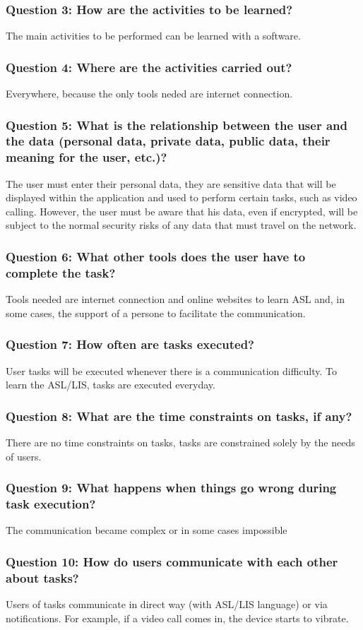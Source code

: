 \subsubsection{Question 3: How are the activities to be learned?}
The main activities to be performed can be learned with a software.

\subsubsection{Question 4: Where are the activities carried out?}
Everywhere, because the only tools neded are internet connection.

\subsubsection{Question 5: What is the relationship between the user and the data (personal data, private data, public data, their meaning for the user, etc.)?}
The user must enter their personal data, they are sensitive data that will be displayed within the application and used to perform certain tasks, such as video calling. However, the user must be aware that his data, even if encrypted, will be subject to the normal security risks of any data that must travel on the network.

\subsubsection{Question 6: What other tools does the user have to complete the task?}
Tools needed are internet connection and online websites to learn ASL and, in some cases, the support of a persone to facilitate the communication.

\subsubsection{Question 7: How often are tasks executed?}
User tasks will be executed whenever there is a communication difficulty. To learn the ASL/LIS, tasks are executed everyday.

\subsubsection{Question 8: What are the time constraints on tasks, if any?}
There are no time constraints on tasks, tasks are constrained solely by the needs of users.

\subsubsection{Question 9: What happens when things go wrong during task execution?}
The communication became complex or in some cases impossible

\subsubsection{Question 10: How do users communicate with each other about tasks?}
Users of tasks communicate in direct way (with ASL/LIS language) or via notifications. For example, if a video call comes in, the device starts to vibrate.
